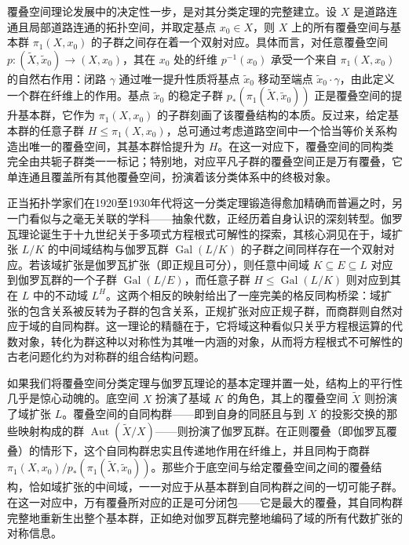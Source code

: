 \documentclass[12pt,a4paper]{article}
\begin{document}
覆叠空间理论发展中的决定性一步，是对其分类定理的完整建立。设 $X$ 是道路连通且局部道路连通的拓扑空间，并取定基点 $x_0 \in X$，则 $X$ 上的所有覆叠空间与基本群 $\pi_1(X, x_0)$ 的子群之间存在着一个双射对应。具体而言，对任意覆叠空间 $p: (\tilde{X}, \tilde{x}_0) \to (X, x_0)$，其在 $x_0$ 处的纤维 $p^{-1}(x_0)$ 承受一个来自 $\pi_1(X, x_0)$ 的自然右作用：闭路 $\gamma$ 通过唯一提升性质将基点 $\tilde{x}_0$ 移动至端点 $\tilde{x}_0 \cdot \gamma$，由此定义一个群在纤维上的作用。基点 $\tilde{x}_0$ 的稳定子群 $p_*(\pi_1(\tilde{X}, \tilde{x}_0))$ 正是覆叠空间的提升基本群，它作为 $\pi_1(X, x_0)$ 的子群刻画了该覆叠结构的本质。反过来，给定基本群的任意子群 $H \le \pi_1(X, x_0)$，总可通过考虑道路空间中一个恰当等价关系构造出唯一的覆叠空间，其基本群恰提升为 $H$。在这一对应下，覆叠空间的同构类完全由共轭子群类一一标记；特别地，对应平凡子群的覆叠空间正是万有覆叠，它单连通且覆盖所有其他覆叠空间，扮演着该分类体系中的终极对象。

正当拓扑学家们在1920至1930年代将这一分类定理锻造得愈加精确而普遍之时，另一门看似与之毫无关联的学科——抽象代数，正经历着自身认识的深刻转型。伽罗瓦理论诞生于十九世纪关于多项式方程根式可解性的探索，其核心洞见在于，域扩张 $L/K$ 的中间域结构与伽罗瓦群 $\operatorname{Gal}(L/K)$ 的子群之间同样存在一个双射对应。若该域扩张是伽罗瓦扩张（即正规且可分），则任意中间域 $K \subseteq E \subseteq L$ 对应到伽罗瓦群的一个子群 $\operatorname{Gal}(L/E)$，而任意子群 $H \le \operatorname{Gal}(L/K)$ 则对应到其在 $L$ 中的不动域 $L^H$。这两个相反的映射给出了一座完美的格反同构桥梁：域扩张的包含关系被反转为子群的包含关系，正规扩张对应正规子群，而商群则自然对应于域的自同构群。这一理论的精髓在于，它将域这种看似只关乎方程根运算的代数对象，转化为群这种以对称性为其唯一内涵的对象，从而将方程根式不可解性的古老问题化约为对称群的组合结构问题。

如果我们将覆叠空间分类定理与伽罗瓦理论的基本定理并置一处，结构上的平行性几乎是惊心动魄的。底空间 $X$ 扮演了基域 $K$ 的角色，其上的覆叠空间 $\tilde{X}$ 则扮演了域扩张 $L$。覆叠空间的自同构群——即到自身的同胚且与到 $X$ 的投影交换的那些映射构成的群 $\operatorname{Aut}(\tilde{X}/X)$——则扮演了伽罗瓦群。在正则覆叠（即伽罗瓦覆叠）的情形下，这个自同构群忠实且传递地作用在纤维上，并且同构于商群 $\pi_1(X, x_0) / p_*(\pi_1(\tilde{X}, \tilde{x}_0))$。那些介于底空间与给定覆叠空间之间的覆叠结构，恰如域扩张的中间域，一一对应于从基本群到自同构群之间的一切可能子群。在这一对应中，万有覆叠所对应的正是可分闭包——它是最大的覆叠，其自同构群完整地重新生出整个基本群，正如绝对伽罗瓦群完整地编码了域的所有代数扩张的对称信息。
\end{document}
